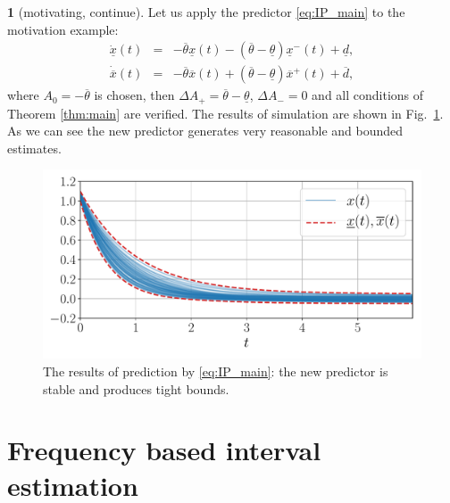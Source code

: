 \documentclass[twocolumn,english]{IEEEtran}
\theoremstyle{plain}
\theoremstyle{definition}
\newtheorem*{example*}{\protect\examplename}
\theoremstyle{plain}
\theoremstyle{plain}
\theoremstyle{remark}
\providecommand{\examplename}{Example}
\begin{document}
\begin{example*}
[motivating, continue] Let us apply the predictor \eqref{eq:IP_main}
to the motivation example:
\begin{eqnarray*}
\dot{\underline{x}}(t) & = & -\overline{\theta}\underline{x}(t)-(\overline{\theta}-\underline{\theta})\underline{x}^{-}(t)+\underline{d},\\
\dot{\overline{x}}(t) & = & -\overline{\theta}\overline{x}(t)+(\overline{\theta}-\underline{\theta})\overline{x}^{+}(t)+\overline{d},
\end{eqnarray*}
where $A_{0}=-\overline{\theta}$ is chosen, then $\Delta A_{+}=\overline{\theta}-\underline{\theta}$, $\Delta A_{-}=0$ and all conditions of Theorem \ref{thm:main} are verified. The results of simulation are shown in Fig.~\ref{fig:IP_New}. As we can see the new predictor generates very reasonable and bounded estimates. 
\begin{figure}
\begin{centering}
\includegraphics[width=\linewidth]{predictor}
\par\end{centering}
\caption{\label{fig:IP_New} The results of prediction by \eqref{eq:IP_main}: the new predictor is stable and produces tight bounds.}
\end{figure}
\end{example*}

\section{Frequency based interval estimation}
\label{sec:Frequency}
\end{document}
